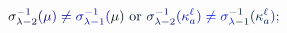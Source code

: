 \documentclass[12pt]{article}
\begin{document}
\makeatletter
\renewcommand*{\@textcolor}[3]{%
  \protect\leavevmode
  \begingroup
    \color#1{#2}#3%
  \endgroup
}
\makeatother
\begin{displaymath}
\mathcolor[RGB]{0,0,15}{\sigma} _ { \mathcolor[RGB]{0,0,30}{\lambda} \mathcolor[RGB]{0,0,45}{-} \mathcolor[RGB]{0,0,60}{2} } ^ { \mathcolor[RGB]{0,0,75}{-} \mathcolor[RGB]{0,0,90}{1} } \mathcolor[RGB]{0,0,105}{(} \mathcolor[RGB]{0,0,120}{\mu} \mathcolor[RGB]{0,0,135}{)} \mathcolor[RGB]{0,0,150}{\neq} \mathcolor[RGB]{0,0,165}{\sigma} _ { \mathcolor[RGB]{0,0,180}{\lambda} \mathcolor[RGB]{0,0,195}{-} \mathcolor[RGB]{0,0,210}{1} } ^ { \mathcolor[RGB]{0,0,225}{-} \mathcolor[RGB]{0,0,240}{1} } \mathcolor[RGB]{0,0,255}{(} \mathcolor[RGB]{0,15,0}{\mu} \mathcolor[RGB]{0,15,15}{)} \mathrm { ~ \mathcolor[RGB]{0,15,30}{o} \mathcolor[RGB]{0,15,45}{r} ~ } \mathcolor[RGB]{0,15,60}{\sigma} _ { \mathcolor[RGB]{0,15,75}{\lambda} \mathcolor[RGB]{0,15,90}{-} \mathcolor[RGB]{0,15,105}{2} } ^ { \mathcolor[RGB]{0,15,120}{-} \mathcolor[RGB]{0,15,135}{1} } \mathcolor[RGB]{0,15,150}{(} \mathcolor[RGB]{0,15,165}{\kappa} _ { \mathcolor[RGB]{0,15,180}{a} } ^ { \mathcolor[RGB]{0,15,195}{\ell} } \mathcolor[RGB]{0,15,210}{)} \mathcolor[RGB]{0,15,225}{\neq} \mathcolor[RGB]{0,15,240}{\sigma} _ { \mathcolor[RGB]{0,15,255}{\lambda} \mathcolor[RGB]{0,30,0}{-} \mathcolor[RGB]{0,30,15}{1} } ^ { \mathcolor[RGB]{0,30,30}{-} \mathcolor[RGB]{0,30,45}{1} } \mathcolor[RGB]{0,30,60}{(} \mathcolor[RGB]{0,30,75}{\kappa} _ { \mathcolor[RGB]{0,30,90}{a} } ^ { \mathcolor[RGB]{0,30,105}{\ell} } \mathcolor[RGB]{0,30,120}{)} \mathcolor[RGB]{0,30,135}{;}
\end{displaymath}
\end{document}
